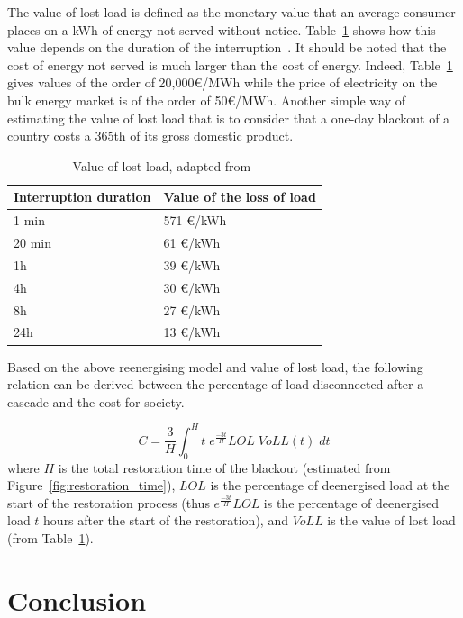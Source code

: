 The value of lost load is defined as the monetary value that an average consumer places on a kWh of energy not served without notice. Table~\ref{tab:VOLL} shows how this value depends on the duration of the interruption~\cite{VOLL}. It should be noted that the cost of energy not served is much larger than the cost of energy. Indeed, Table~\ref{tab:VOLL} gives values of the order of 20,000€/MWh while the price of electricity on the bulk energy market is of the order of 50€/MWh. Another simple way of estimating the value of lost load that is to consider that a one-day blackout of a country costs a 365th of its gross domestic product.

\begin{table}
    \centering
    \caption{Value of lost load, adapted from~\cite{VOLL}}
    \label{tab:VOLL}
    \begin{tabular}{@{}ll@{}}
    \toprule
    Interruption duration & Value of the loss of load \\ \midrule
    1 min  & 571 €/kWh \\
    20 min & 61 €/kWh \\
    1h     & 39 €/kWh \\
    4h     & 30 €/kWh \\
    8h     & 27 €/kWh \\
    24h    & 13 €/kWh \\ \bottomrule
    \end{tabular}
\end{table}

Based on the above reenergising model and value of lost load, the following relation can be derived between the percentage of load disconnected after a cascade and the cost for society.

\begin{equation}
    \label{eq:VOLL}
    C = \frac{3}{H} \int_0^H t \; e^{\frac{-3t}{H}} LOL \; VoLL(t) \; dt
\end{equation}
\noindent where \(H\) is the total restoration time of the blackout (estimated from Figure~\ref{fig:restoration_time}), \(LOL\) is the percentage of deenergised load at the start of the restoration process (thus \(e^{\frac{-3t}{H}} LOL\) is the percentage of deenergised load \(t\) hours after the start of the restoration), and \(VoLL\) is the value of lost load (from Table~\ref{tab:VOLL}).


\section{Conclusion}
\label{sec:security-conclusions}

